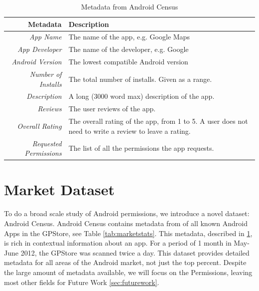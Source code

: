 \begin{table}[t]
\begin{small}
\begin{tabular}{r|l}
Metadata & Description \\
\hline

\textit{App Name} & The name of the app, e.g. Google Maps  \\
\textit{App Developer} & The name of the developer, e.g. Google  \\
\textit{Android Version} & The lowest compatible Android version  \\
\textit{Number of Installs} &  The total number of installs. Given as a range. \\
\textit{Description} &  A long (3000 word max) description of the app. \\
\textit{Reviews} &  The user reviews of the app. \\
\textit{Overall Rating} &  The overall rating of the app, from 1 to 5. A user does not need to write a review to leave a rating. \\
\textit{Requested Permissions} &  The list of all the permissions the app requests. \\

\end{tabular}
\end{small}
\caption{Metadata from Android Census}
\label{tab:marketmetadata}
\end{table}





\section{Market Dataset}
To do a broad scale study of Android permissions, we introduce a novel dataset: Android Census. Android Census contains metadata from  of all known Android Apps in the GPStore, see Table \ref{tab:marketstats}. This metadata, described in \ref{tab:marketmetadata}, is rich in contextual information about an app. For a period of 1 month in May-June 2012, the GPStore was scanned twice a day. This dataset provides detailed metadata for all areas of the Android market, not just the top percent. Despite the large amount of metadata available, we will focus on the Permissions, leaving most other fields for Future Work \ref{sec:futurework}.

